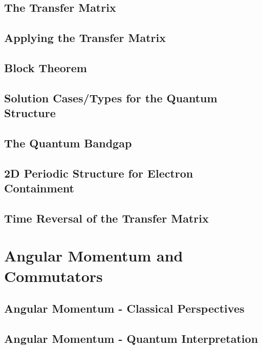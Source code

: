 \documentclass[colorlinks,11pt,a4paper,normalphoto,withhyper,ragged2e]{altareport}
\begin{document}
	\subsection{The Transfer Matrix}
	
	
	\subsection{Applying the Transfer Matrix}
	
	
	\subsection{Block Theorem}
	
	
	\subsection{Solution Cases/Types for the Quantum Structure}
	
	
	\subsection{The Quantum Bandgap}
	
	
	\subsection{2D Periodic Structure for Electron Containment}
	
	
	\subsection{Time Reversal of the Transfer Matrix}
	
	
	\pagebreak
	
	
	
	
\section{Angular Momentum and Commutators}
	
	\subsection{Angular Momentum - Classical Perspectives}
	
	
	\subsection{Angular Momentum - Quantum Interpretation}
	
\end{document}
